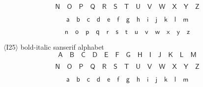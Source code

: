 \documentclass{book}
\begin{document}
\[\mathbf{\mathsf{N}}\quad \mathbf{\mathsf{O}}\quad \mathbf{\mathsf{P}}\quad 
\mathbf{\mathsf{Q}}\quad \mathbf{\mathsf{R}}\quad \mathbf{\mathsf{S}}\quad \mathbf{\mathsf{T}}\quad 
\mathbf{\mathsf{U}}\quad \mathbf{\mathsf{V}}\quad \mathbf{\mathsf{W}}\quad \mathbf{\mathsf{X}}\quad 
\mathbf{\mathsf{Y}}\quad \mathbf{\mathsf{Z}}\]

\[\mathbf{\mathsf{a}}\quad \mathbf{\mathsf{b}}\quad
\mathbf{\mathsf{c}}\quad \mathbf{\mathsf{d}}\quad \mathbf{\mathsf{e}}\quad \mathbf{\mathsf{f}}\quad 
\mathbf{\mathsf{g}}\quad \mathbf{\mathsf{h}}\quad \mathbf{\mathsf{i}}\quad \mathbf{\mathsf{j}}\quad 
\mathbf{\mathsf{k}}\quad \mathbf{\mathsf{l}}\quad \mathbf{\mathsf{m}}\]

\[\mathbf{\mathsf{n}}\quad 
\mathbf{\mathsf{o}}\quad \mathbf{\mathsf{p}}\quad \mathbf{\mathsf{q}}\quad \mathbf{\mathsf{r}}\quad 
\mathbf{\mathsf{s}}\quad \mathbf{\mathsf{t}}\quad \mathbf{\mathsf{u}}\quad \mathbf{\mathsf{v}}\quad 
\mathbf{\mathsf{w}}\quad \mathbf{\mathsf{x}}\quad \mathbf{\mathsf{y}}\quad \mathbf{\mathsf{z}}\]

$\langle$I25$\rangle$ bold-italic sanserif alphabet
\[\mathit{\mathbf{\mathsf{A}}}\quad \mathit{\mathbf{\mathsf{B}}}\quad \mathit{\mathbf{\mathsf{C}}}\quad 
\mathit{\mathbf{\mathsf{D}}}\quad \mathit{\mathbf{\mathsf{E}}}\quad \mathit{\mathbf{\mathsf{F}}}\quad 
\mathit{\mathbf{\mathsf{G}}}\quad \mathit{\mathbf{\mathsf{H}}}\quad \mathit{\mathbf{\mathsf{I}}}\quad 
\mathit{\mathbf{\mathsf{J}}}\quad \mathit{\mathbf{\mathsf{K}}}\quad \mathit{\mathbf{\mathsf{L}}}\quad 
\mathit{\mathbf{\mathsf{M}}}\] 

\[\mathit{\mathbf{\mathsf{N}}}\quad \mathit{\mathbf{\mathsf{O}}}\quad 
\mathit{\mathbf{\mathsf{P}}}\quad \mathit{\mathbf{\mathsf{Q}}}\quad \mathit{\mathbf{\mathsf{R}}}\quad 
\mathit{\mathbf{\mathsf{S}}}\quad \mathit{\mathbf{\mathsf{T}}}\quad \mathit{\mathbf{\mathsf{U}}}\quad 
\mathit{\mathbf{\mathsf{V}}}\quad \mathit{\mathbf{\mathsf{W}}}\quad \mathit{\mathbf{\mathsf{X}}}\quad 
\mathit{\mathbf{\mathsf{Y}}}\quad \mathit{\mathbf{\mathsf{Z}}}\]

\[\mathit{\mathbf{\mathsf{a}}}\quad 
\mathit{\mathbf{\mathsf{b}}}\quad \mathit{\mathbf{\mathsf{c}}}\quad \mathit{\mathbf{\mathsf{d}}}\quad 
\mathit{\mathbf{\mathsf{e}}}\quad \mathit{\mathbf{\mathsf{f}}}\quad \mathit{\mathbf{\mathsf{g}}}\quad 
\mathit{\mathbf{\mathsf{h}}}\quad \mathit{\mathbf{\mathsf{i}}}\quad \mathit{\mathbf{\mathsf{j}}}\quad 
\mathit{\mathbf{\mathsf{k}}}\quad \mathit{\mathbf{\mathsf{l}}}\quad \mathit{\mathbf{\mathsf{m}}}\]
\end{document}
